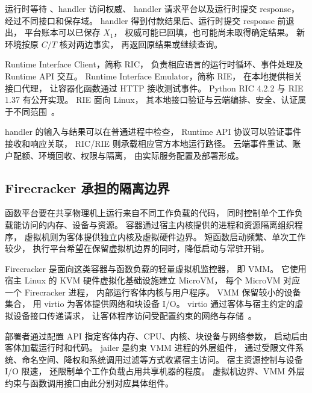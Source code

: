 
运行时等待 、handler 访问权威、
handler 请求平台以及运行时提交 response，
经过不同接口和保存域。
handler 得到付款结果后、运行时提交 response 前退出，
平台账本可以已保存 $X_1$，
权威可能已回填，也可能尚未取得确定结果。
新环境按原 $C/T$ 核对两边事实，
再返回原结果或继续查询。


Runtime Interface Client，简称 RIC，
负责相应语言的运行时循环、事件处理及 Runtime API 交互。
Runtime Interface Emulator，简称 RIE，
在本地提供相关接口代理，
让容器化函数通过 HTTP 接收测试事件。
Python RIC 4.2.2 与 RIE 1.37 有公开实现。
RIE 面向 Linux，
其本地接口验证与云端编排、安全、认证属于不同范围~\cite{lambda-ric-rie}。

handler 的输入与结果可以在普通进程中检查，
Runtime API 协议可以验证事件接收和响应关联，
RIC/RIE 则承载相应官方本地运行路径。
云端事件重试、账户配额、环境回收、权限与隔离，
由实际服务配置及部署形成。

\subsection{Firecracker 承担的隔离边界}

函数平台要在共享物理机上运行来自不同工作负载的代码，
同时控制单个工作负载能访问的内存、设备与资源。
容器通过宿主内核提供的进程和资源隔离组织程序，
虚拟机则为客体提供独立内核及虚拟硬件边界。
短函数启动频繁、单次工作较少，
执行平台希望在保留虚拟机边界的同时，降低启动与常驻开销。

Firecracker 是面向这类容器与函数负载的轻量虚拟机监控器，
即 VMM。
它使用宿主 Linux 的 KVM 硬件虚拟化基础设施建立 MicroVM，
每个 MicroVM 对应一个 Firecracker 进程，
内部运行客体内核与用户程序。
VMM 保留较小的设备集合，
用 virtio 为客体提供网络和块设备 I/O。
virtio 通过客体与宿主约定的虚拟设备接口传递请求，
让客体程序访问受配置约束的网络与存储~\cite{firecracker-design}。

部署者通过配置 API 指定客体内存、CPU、内核、块设备与网络参数，
启动后由客体加载运行时和代码。
jailer 是约束 VMM 进程的外层组件，
通过受限文件系统、命名空间、降权和系统调用过滤等方式收紧宿主访问。
宿主资源控制与设备 I/O 限速，
还限制单个工作负载占用共享机器的程度。
虚拟机边界、VMM 外层约束与函数调用接口由此分别对应具体组件。



